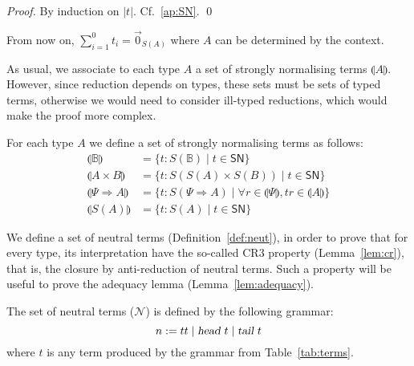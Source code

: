 \documentclass[preprint]{elsarticle}
\newcommand\interp[1]{\llparenthesis #1\rrparenthesis}
\newcommand\SN{\mathsf{SN}}
\newcommand\B{\ensuremath{\mathbb B}}
\newcommand\head{\text{\sl head}}
\newcommand\tail{\text{\sl tail}}
\newcommand\z[1][A]{\vec 0_{S(#1)}}
\begin{document}
\begin{proof}
  By induction on $|t|$. Cf.~\ref{ap:SN}. \qed
\end{proof}

From now on, $\sum_{i=1}^0 t_i=\z$ where $A$ can be determined by the context.

As usual, we associate to each type $A$ a set of strongly normalising terms
$\interp A$. However, since reduction depends on types, these sets must be
sets of typed terms, otherwise we would need to consider ill-typed reductions,
which would make the proof more complex.
\begin{definition}
  For each type $A$ we define a set of strongly normalising terms as follows:
  \begin{align*}
    \interp{\B} & = \{ t : S(\B) \mid t \in \SN \} \\
    \interp{A \times B} & = \{  t : S(S(A) \times S(B)) \mid t \in \SN \}\\
    \interp{\Psi \Rightarrow A} & = \{  t : S(\Psi \Rightarrow A) \mid \forall r \in \interp{\Psi}, t r \in \interp{A} \} \\
    \interp{S(A)} & = \{  t : S(A) \mid t \in \SN \}
  \end{align*}
\end{definition}

We define a set of neutral terms (Definition~\ref{def:neut}), in order to prove
that for every type, its interpretation have the so-called CR3 property
(Lemma~\ref{lem:cr}), that is, the closure by anti-reduction of neutral terms.
Such a property will be useful to prove the adequacy lemma
(Lemma~\ref{lem:adequacy}).
\begin{definition}\label{def:neut}
  The set of neutral terms (\( \mathcal N \)) is defined by the following
  grammar:
  \[
    n:= tt \mid\head\ t\mid\tail\ t
  \]
  where $t$ is any term produced by the grammar from Table~\ref{tab:terms}.
\end{definition}
\end{document}
